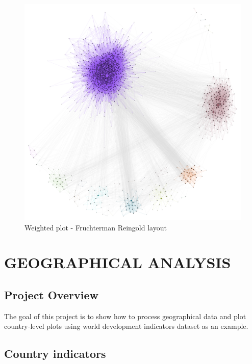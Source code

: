 \documentclass[12pt, a4paper]{article}
\begin{document}
\begin{figure}
    \centering
    \includegraphics[width=\textwidth]{src/youtube/hdg_weighted/hdg_pg_fg}
    \caption{Weighted plot - Fruchterman Reingold layout}
    \label{fig:hdg_pg_fg}
\end{figure}


\newpage
\section{GEOGRAPHICAL ANALYSIS}

\subsection{Project Overview}

The goal of this project is to show how to process geographical data and plot country-level plots using world development indicators dataset as an example.

\subsection{Country indicators}
\end{document}
